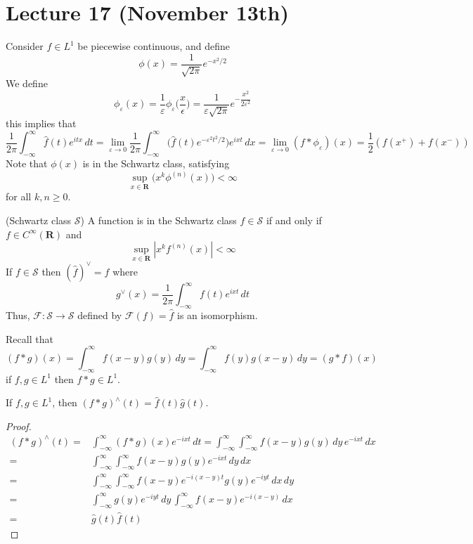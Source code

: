 \section{Lecture 17 (November 13th)}
\begin{recall}
Consider $f\in L^{1}$ be piecewise continuous, and define
\[\phi (x)=\dfrac{1}{\sqrt{2\pi }}e^{-x^2/2}\]
We define
\[\phi _{\varepsilon }(x)=\dfrac{1}{\varepsilon  }\phi _{\varepsilon }\Big(\dfrac{x}{\epsilon }\Big)=\dfrac{1}{\varepsilon  \sqrt{2\pi }}e^{-\dfrac{x^2}{2\varepsilon  ^2}}\]
this implies that
\[\dfrac{1}{2\pi }\int ^{\infty }_{-\infty }\hat{f}(t)e^{itx}\,dt=\lim _{\varepsilon  \rightarrow 0}\dfrac{1}{2\pi }\int ^{\infty }_{-\infty }\Big(\hat{f}(t)e^{-\varepsilon  ^2t^2/2}\Big)e^{ixt}\,dx=\lim _{\varepsilon \rightarrow 0}(f\ast \phi _{\varepsilon })(x)=\dfrac{1}{2}(f(x^{+})+f(x^{-}))\]
Note that $\phi (x)$ is in the Schwartz class, satisfying
\[\sup_{x\in {\bm R}}\Big(x^{k}\phi ^{(n)}(x)\Big)<\infty \]
for all $k,n\geq 0$. 
\end{recall}
\vspace{2ex}
\begin{defi}
(Schwartz class $\mathcal{S}$) A function is in the Schwartz class $f\in \mathcal{S}$ if and only if $f\in C^{\infty }({\bm R})$ and 
\[\sup_{x\in {\bm R}}|x^{k}f^{(n)}(x)|<\infty \]
If $f\in \mathcal{S}$ then $(\hat{f})^{\vee}=f$ where
\[g^{\vee}(x)=\dfrac{1}{2\pi }\int ^{\infty }_{-\infty }f(t)e^{ixt}\,dt\]
Thus, $\mathcal{F}:\mathcal{S}\rightarrow \mathcal{S}$ defined by $\mathcal{F}(f)=\hat{f}$ is an isomorphism. 
\end{defi}
\vspace{2ex}
\begin{recall}
Recall that 
\[(f\ast g)(x)=\int ^{\infty }_{-\infty }f(x-y)g(y)\,dy=\int ^{\infty }_{-\infty }f(y)g(x-y)\,dy=(g\ast f)(x)\]
if $f,g\in L^{1}$ then $f\ast g\in L^{1}$. 
\end{recall}
\vspace{2ex}
\begin{thm}
If $f,g\in L^{1}$, then $(f\ast g)^{\wedge}(t)=\hat{f}(t)\hat{g}(t)$. 
\end{thm}
\begin{proof}
\[\begin{align*}
(f\ast g)^{\wedge}(t)=&\int ^{\infty }_{-\infty }(f\ast g)(x)e^{-ixt}\,dt=\int ^{\infty }_{-\infty }\int ^{\infty }_{-\infty }f(x-y)g(y)\,dy\,e^{-ixt}\,dx\\
=&\int ^{\infty }_{-\infty }\int _{-\infty }^{\infty }f(x-y)g(y)e^{-ixt}\,dy\,dx\\
=&\int _{-\infty }^{\infty }\int _{-\infty }^{\infty }f(x-y)e^{-i(x-y)t}g(y)e^{-iyt}\,dx\,dy\\
=&\int _{-\infty }^{\infty }g(y)e^{-iyt}\,dy\,\int _{-\infty }^{\infty }f(x-y)e^{-i(x-y)}\,dx\\
=&\hat{g}(t)\hat{f}(t)
\end{align*}\]
\end{proof}
